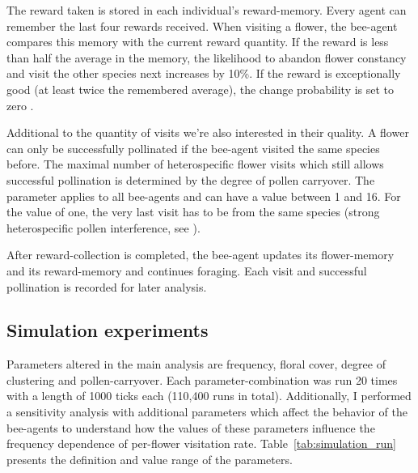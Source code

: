 The reward taken is stored in each individual's reward-memory. Every agent can remember the last four rewards received. When visiting a flower, the bee-agent compares this memory with the current reward quantity. If the reward is less than half the average in the memory, the likelihood to abandon flower constancy and visit the other species next increases by 10\%. If the reward is exceptionally good (at least twice the remembered average), the change probability is set to zero  \citep{chittka1997foraging, keasar1996innate}. 

Additional to the quantity of visits we're also interested in their quality. A flower can only be successfully pollinated if the bee-agent visited the same species before. The maximal number of heterospecific flower visits which still allows successful pollination is determined by the degree of pollen carryover. The parameter applies to all bee-agents and can have a value between 1 and 16. For the value of one, the very last visit has to be from the same species (strong heterospecific pollen interference, see \citealt{campbell1986predicting,benadi2012population,montgomery2009pollen}).

After reward-collection is completed, the bee-agent updates its flower-memory and its reward-memory and continues foraging. Each visit and successful pollination is recorded for later analysis. 


\subsection*{Simulation experiments}

Parameters altered in the main analysis are frequency, floral cover, degree of clustering and pollen-carryover. Each parameter-combination was run 20 times with a length of 1000 ticks each (110,400 runs in total). Additionally, I performed a sensitivity analysis with additional parameters which affect the behavior of the bee-agents to understand how the values of these parameters influence the frequency dependence of per-flower visitation rate. Table~\ref{tab:simulation_run} presents the definition and value range of the parameters.
 

